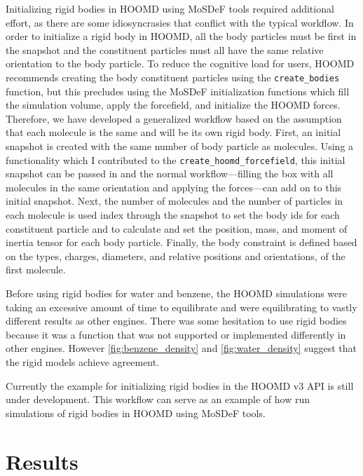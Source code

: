 Initializing rigid bodies in HOOMD using MoSDeF tools required additional effort, as there are some idiosyncrasies that conflict with the typical workflow.
In order to initialize a rigid body in HOOMD, all the body particles must be first in the snapshot and the constituent particles must all have the same relative orientation to the body particle. 
To reduce the cognitive load for users, HOOMD recommends creating the body constituent particles using the \lstinline{create_bodies} function, but this precludes using the MoSDeF initialization functions which fill the simulation volume, apply the forcefield, and initialize the HOOMD forces.
Therefore, we have developed a generalized workflow based on the assumption that each molecule is the same and will be its own rigid body.
First, an initial snapshot is created with the same number of body particle as molecules.
Using a functionality which I contributed to the \lstinline{create_hoomd_forcefield}, this initial snapshot can be passed in and the normal workflow---filling the box with all molecules in the same orientation and applying the forces---can add on to this initial snapshot. 
Next, the number of molecules and the number of particles in each molecule is used index through the snapshot to set the body ids for each constituent particle and to calculate and set the position, mass, and moment of inertia tensor for each body particle.
Finally, the body constraint is defined based on the types, charges, diameters, and relative positions and orientations, of the first molecule.

Before using rigid bodies for water and benzene, the HOOMD simulations were taking an excessive amount of time to equilibrate and were equilibrating to vastly different results as other engines.
There was some hesitation to use rigid bodies because it was a function that was not supported or implemented differently in other engines.
However \autoref{fig:benzene_density} and \autoref{fig:water_density} suggest that the rigid models achieve agreement.

Currently the example for initializing rigid bodies in the HOOMD v3 API is still under development.
This workflow can serve as an example of how run simulations of rigid bodies in HOOMD using MoSDeF tools.

\section{Results} 

